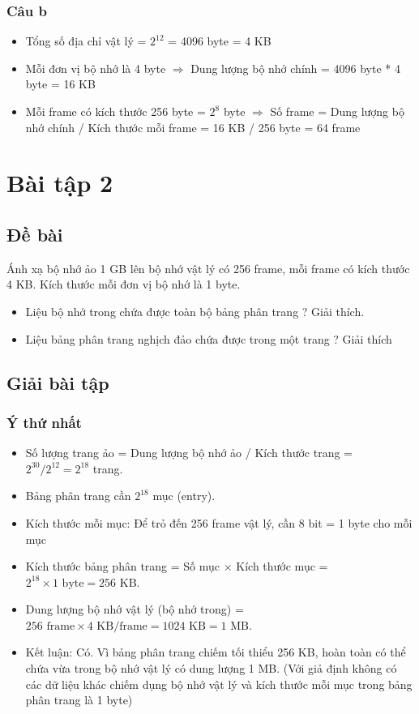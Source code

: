 \documentclass[12pt, letterpaper]{article}
\begin{document}
\subsubsection{Câu b}
\begin{itemize}
    \item Tổng số địa chỉ vật lý = $2^{12}$ = 4096 byte = 4 KB
    \item Mỗi đơn vị bộ nhớ là 4 byte $\Rightarrow$ Dung lượng bộ nhớ chính = 4096 byte * 4 byte = 16 KB
    \item Mỗi frame có kích thước 256 byte = $2^8$ byte $\Rightarrow$ Số frame = Dung lượng bộ nhớ chính / Kích thước mỗi frame = 16 KB / 256 byte = 64 frame
\end{itemize}
\section{Bài tập 2}
\subsection{Đề bài}
Ánh xạ bộ nhớ ảo 1 GB lên bộ nhớ vật lý có 256 frame,
mỗi frame có kích thước 4 KB. Kích thước mỗi đơn vị bộ
nhớ là 1 byte.
\begin{itemize}
    \item Liệu bộ nhớ trong chứa được toàn bộ bảng phân trang ?
Giải thích.
    \item Liệu bảng phân trang nghịch đảo chứa được trong một
trang ? Giải thích
\end{itemize}
\subsection{Giải bài tập}
\subsubsection{Ý thứ nhất}
\begin{itemize}
    \item Số lượng trang ảo = Dung lượng bộ nhớ ảo / Kích thước trang = $2^{30} / 2^{12} = 2^{18}$ trang.
    \item Bảng phân trang cần $2^{18}$ mục (entry).
    \item Kích thước mỗi mục: Để trỏ đến 256 frame vật lý, cần 8 bit = 1 byte cho mỗi mục
    \item Kích thước bảng phân trang = Số mục $\times$ Kích thước mục = $2^{18} \times 1 \text{ byte} = 256 \text{ KB}$.
    \item Dung lượng bộ nhớ vật lý (bộ nhớ trong) = $256 \text{ frame} \times 4 \text{ KB/frame} = 1024 \text{ KB} = 1 \text{ MB}$.
    \item Kết luận: Có. Vì bảng phân trang chiếm tối thiểu 256 KB, hoàn toàn có thể chứa vừa trong bộ nhớ vật lý có dung lượng 1 MB. (Với giả định không có các dữ liệu khác chiếm dụng bộ nhớ vật lý và kích thước mỗi mục trong bảng phân trang là 1 byte)
\end{itemize}
\end{document}
